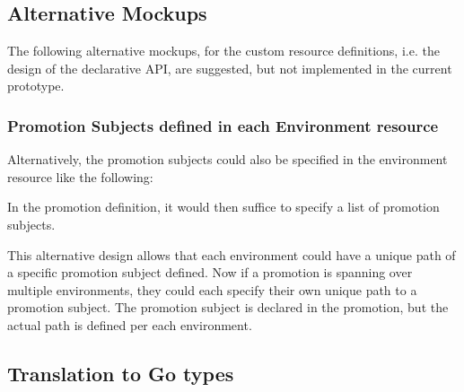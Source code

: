 \subsection{Alternative Mockups}
\label{prototype:design:alternative-mockups}

The following alternative mockups,
for the custom resource definitions,
i.e. the design of the declarative API,
are suggested, but not implemented in the current prototype.

\subsubsection*{Promotion Subjects defined in each Environment resource}

Alternatively, the promotion subjects could also be specified
in the environment resource like the following:



In the promotion definition,
it would then suffice to specify
a list of promotion subjects.



This alternative design allows that each environment could have
a unique path of a specific promotion subject defined.
Now if a promotion is spanning over multiple environments,
they could each specify their own unique path to a promotion subject.
The promotion subject is declared in the promotion,
but the actual path is defined per each environment.

\subsection{Translation to Go types}
\label{prototype:design:go-types}

